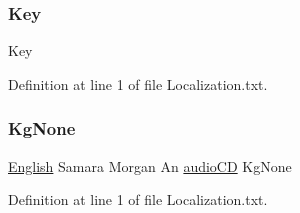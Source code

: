 \subsubsection{\texorpdfstring{Key}{Key}}
{\footnotesize\ttfamily Key}



Definition at line 1 of file Localization.\+txt.

\mbox{\label{_dishong_01_tower_01_challenge_2_config_2_localization_8txt_acc1c43e0980c5828bcfaf85313744919}} 
\subsubsection{\texorpdfstring{KgNone}{KgNone}}
{\footnotesize\ttfamily \mbox{\hyperlink{_sphere_i_i_01_winter_01_project_2_config_2_localization_8txt_ad896b63205779b1b09e86d941ce13976}{English}} Samara Morgan An \mbox{\hyperlink{_sphere_i_i_01_music_01_boxes_2_config_2_localization_8txt_ae0a4281bb52a78c638f75d315de5da12}{audio\+CD}} Kg\+None}



Definition at line 1 of file Localization.\+txt.

\mbox{\label{_dishong_01_tower_01_challenge_2_config_2_localization_8txt_a55c08aa69484130b083dd56f090edec5}} 
